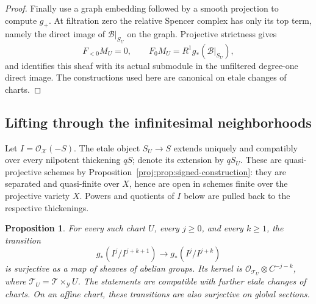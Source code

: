 \documentclass[11pt,letterpaper]{article}
\newtheorem{proposition}[theorem]{Proposition}
\theoremstyle{definition}
\theoremstyle{remark}
\begin{document}
\begin{proof}
Finally use a graph embedding followed by a smooth projection to
compute \(g_+\).  At filtration zero the relative Spencer complex
has only its top term, namely the direct image of
\(\mathcal B|_{S_U}\) on the graph.  Projective strictness gives
\[
 F_{<0}M_U=0,\qquad
 F_0M_U=R^1g_*(\mathcal B|_{S_U}),
\]
and identifies this sheaf with its actual submodule in the
unfiltered degree-one direct image.  The constructions used here
are canonical on etale changes of charts.
\end{proof}

\subsection{Lifting through the infinitesimal neighborhoods}

Let \(I=\mathcal{O}_{\mathcal X}(-S)\).  The etale object \(S_U\to S\)
extends uniquely and compatibly over every nilpotent thickening
\(qS\); denote its extension by \(qS_U\).
These are quasi-projective schemes by
Proposition~\ref{proj:prop:signed-construction}: they are separated
and quasi-finite over \(X\), hence are open in schemes finite over
the projective variety \(X\).  Powers and quotients of \(I\) below
are pulled back to the respective thickenings.

\begin{proposition}\label{proj:prop:formal-lifting}
For every such chart \(U\), every \(j\geq0\), and every \(k\geq1\),
the transition
\[
 g_*(I^j/I^{j+k+1})
       \longrightarrow g_*(I^j/I^{j+k})
\]
is surjective as a map of sheaves of abelian groups.  Its kernel is
\(\mathcal{O}_{\mathcal T_U}\otimes C^{-j-k}\), where
\(\mathcal T_U=\mathcal T\times_{\mathcal Y}U\).
The statements are compatible with further etale changes of
charts.  On an affine chart, these transitions are also
surjective on global sections.
\end{proposition}
\end{document}
